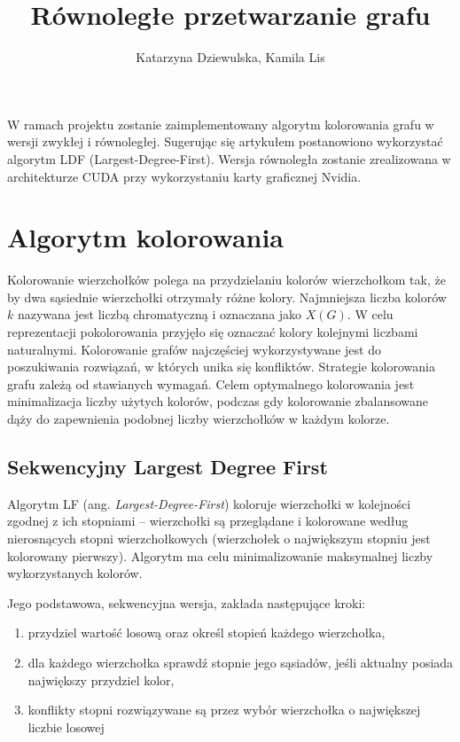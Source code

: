 \documentclass{article}
\date{}
\author{Katarzyna Dziewulska, Kamila Lis}
\title{Równoległe przetwarzanie grafu}
\begin{document}
	\maketitle
	W ramach projektu zostanie zaimplementowany algorytm kolorowania grafu w wersji zwykłej i równoległej. Sugerując się artykułem \cite{article} postanowiono wykorzystać algorytm LDF (Largest-Degree-First). Wersja równoległa zostanie zrealizowana w architekturze CUDA przy wykorzystaniu karty graficznej Nvidia.\\
	
	\section{Algorytm kolorowania}
	Kolorowanie wierzchołków polega na  przydzielaniu kolorów wierzchołkom tak, że by dwa sąsiednie wierzchołki otrzymały różne kolory. Najmniejsza liczba kolorów $k$ nazywana jest liczbą chromatyczną i oznaczana jako $X(G)$. W celu reprezentacji pokolorowania przyjęło się oznaczać kolory kolejnymi liczbami naturalnymi. Kolorowanie grafów najczęściej wykorzystywane jest do poszukiwania rozwiązań, w których unika się konfliktów. Strategie kolorowania grafu zależą od stawianych wymagań. Celem optymalnego kolorowania jest minimalizacja liczby użytych kolorów, podczas gdy kolorowanie zbalansowane dąży do zapewnienia podobnej liczby wierzchołków w każdym kolorze.
	\subsection{Sekwencyjny Largest Degree First}
	Algorytm LF (ang. \textit{Largest-Degree-First}) koloruje wierzchołki w kolejności zgodnej z ich stopniami -- wierzchołki są przeglądane i kolorowane według nierosnących stopni wierzchołkowych (wierzchołek o największym stopniu jest kolorowany pierwszy). Algorytm ma celu minimalizowanie maksymalnej liczby wykorzystanych kolorów. 
	
	Jego podstawowa, sekwencyjna wersja, zakłada następujące kroki:
	\begin{enumerate}
		\itemsep0em
		\item przydziel wartość losową oraz określ stopień każdego wierzchołka,
		\item dla każdego wierzchołka sprawdź stopnie jego sąsiadów, jeśli aktualny posiada największy przydziel kolor,
		\item konflikty stopni rozwiązywane są przez wybór wierzchołka o największej liczbie losowej
	\end{enumerate}
	
\end{document}
